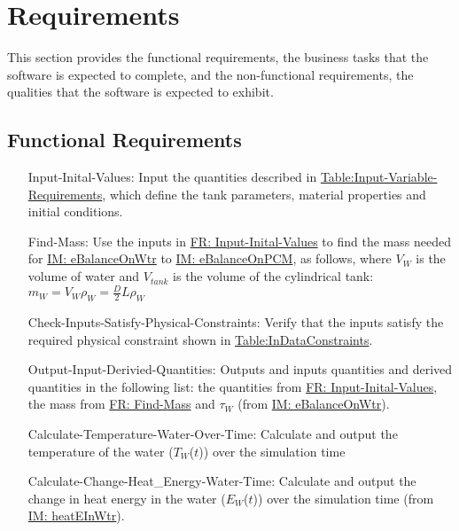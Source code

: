 \documentclass[12pt]{article}
\begin{document}
\section{Requirements}
\label{Sec:Requirements}
This section provides the functional requirements, the business tasks that the software is expected to complete, and the non-functional requirements, the qualities that the software is expected to exhibit.
\subsection{Functional Requirements}
\label{Sec:FRs}
\begin{itemize}
\item[Input-Inital-Values:\phantomsection\label{reqIIV}]Input the quantities described in \hyperref[Table:Input-Variable-Requirements]{Table:Input-Variable-Requirements}, which define the tank parameters, material properties and initial conditions.
\item[Find-Mass:\phantomsection\label{reqFM}]Use the inputs in \hyperref[reqIIV]{FR: Input-Inital-Values} to find the mass needed for \hyperref[IM:eBalanceOnWtr]{IM: eBalanceOnWtr} to \hyperref[IM:eBalanceOnPCM]{IM: eBalanceOnPCM}, as follows, where ${V_{W}}$ is the volume of water and ${V_{tank}}$ is the volume of the cylindrical tank: ${m_{W}}={V_{W}} {ρ_{W}}=\frac{D}{2} L {ρ_{W}}$
\item[Check-Inputs-Satisfy-Physical-Constraints:\phantomsection\label{reqCISPC}]Verify that the inputs satisfy the required physical constraint shown in \hyperref[Table:InDataConstraints]{Table:InDataConstraints}.
\item[Output-Input-Derivied-Quantities:\phantomsection\label{reqOIDQ}]Outputs and inputs quantities and derived quantities in the following list: the quantities from \hyperref[reqIIV]{FR: Input-Inital-Values}, the mass from \hyperref[reqFM]{FR: Find-Mass} and ${τ_{W}}$ (from \hyperref[IM:eBalanceOnWtr]{IM: eBalanceOnWtr}).
\item[Calculate-Temperature-Water-Over-Time:\phantomsection\label{reqCTWOT}]Calculate and output the temperature of the water (${T_{W}}$($t$)) over the simulation time
\item[Calculate-Change-Heat\_Energy-Water-Time:\phantomsection\label{reqCCHEWT}]Calculate and output the change in heat energy in the water (${E_{W}}$($t$)) over the simulation time (from \hyperref[IM:heatEInWtr]{IM: heatEInWtr}).
\end{itemize}
\end{document}
